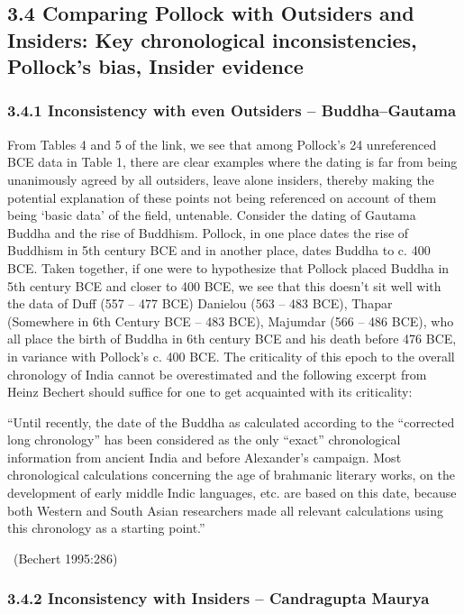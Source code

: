\subsection*{3.4 Comparing Pollock with Outsiders and Insiders: Key chronological inconsistencies, Pollock’s bias, Insider evidence}

\subsubsection*{3.4.1 Inconsistency with even Outsiders – Buddha–Gautama}

From Tables 4 and 5 of the link, we see that among Pollock’s 24 unreferenced BCE data in Table 1, there are clear examples where the dating is far from being unanimously agreed by all outsiders, leave alone insiders, thereby making the potential explanation of these points not being referenced on account of them being ‘basic data’ of the field, untenable. Consider the dating of Gautama Buddha and the rise of Buddhism. Pollock, in one place dates the rise of Buddhism in 5th century BCE and in another place, dates Buddha to c. 400 BCE. Taken together, if one were to hypothesize that Pollock placed Buddha in 5th century BCE and closer to 400 BCE, we see that this doesn’t sit well with the data of Duff (557 – 477 BCE) Danielou (563 – 483 BCE), Thapar (Somewhere in 6th Century BCE – 483 BCE), Majumdar (566 – 486 BCE), who all place the birth of Buddha in 6th century BCE and his death before 476 BCE, in variance with Pollock’s c. 400 BCE. The criticality of this epoch to the overall chronology of India cannot be overestimated and the following excerpt from Heinz Bechert should suffice for one to get acquainted with its criticality:

\begin{myquote}
“Until recently, the date of the Buddha as calculated according to the “corrected long chronology” has been considered as the only “exact” chronological information from ancient India and before Alexander’s campaign. Most chronological calculations concerning the age of brahmanic literary works, on the development of early middle Indic languages, etc. are based on this date, because both Western and South Asian researchers made all relevant calculations using this chronology as a starting point.” 

~\hfill (Bechert 1995:286)
\end{myquote}


\subsubsection*{3.4.2 Inconsistency with Insiders – Candragupta Maurya}

